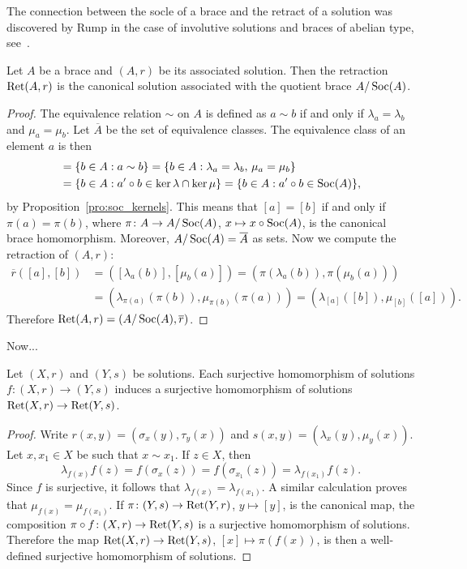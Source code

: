 The connection between the socle of a brace and the 
retract of a solution was discovered by Rump in the case of 
involutive solutions and braces of abelian type, see~\cite{MR2278047}. 

\begin{proposition}
\label{pro:add_cyclic}
Let $A$ be a brace and $(A,r)$ be its associated solution. 
Then the retraction $\operatorname{Ret}(A,r)$ is the canonical solution associated with the quotient brace $A/\operatorname{Soc}(A)$. 
\end{proposition}

\begin{proof}
    The equivalence relation $\sim$ on $A$ is defined as $a\sim b$ if and only if $\lambda_a=\lambda_b$ and 
    $\mu_a=\mu_b$. Let $\overline{A}$ be the set of equivalence classes. 
    The equivalence class of an element $a$ is then
    \begin{align*}
    [a]&=\{b\in A:a\sim b\}
    =\{b\in A:\lambda_a=\lambda_b,\,\mu_a=\mu_b\}\\
    &=\{b\in A:a'\circ b\in \ker\lambda\cap\ker\mu\}=\{b\in A:a'\circ b\in\Soc(A)\},
    \end{align*}
    by Proposition~\ref{pro:soc_kernels}. This means that 
    $[a]=[b]$ if and only if $\pi(a)=\pi(b)$, where $\pi\colon A\to A/\operatorname{Soc}(A)$, $x\mapsto x\circ\operatorname{Soc}(A)$,  
    is the canonical brace homomorphism. Moreover, $A/\operatorname{Soc}(A)=\overline{A}$ as sets. 
    Now we compute the retraction of $(A,r)$:
    \begin{align*}
        \overline{r}([a],[b]) &= ([\lambda_a(b)],[\mu_b(a)])
        =(\pi(\lambda_a(b)),\pi(\mu_b(a)))\\
        &=\left(\lambda_{\pi(a)}(\pi(b)),\mu_{\pi(b)}(\pi(a))\right)
        =\left(\lambda_{[a]}([b]),\mu_{[b]}([a])\right).
    \end{align*}
    Therefore $\operatorname{Ret}(A,r)=(A/\operatorname{Soc}(A),\overline{r})$. 
\end{proof}

Now...

\begin{proposition}
\label{pro:mpl}
Let $(X,r)$ and $(Y,s)$ be solutions. Each surjective homomorphism 
of solutions $f\colon (X,r)\to (Y,s)$ 
induces a surjective homomorphism 
of solutions $\operatorname{Ret}(X,r)\to\operatorname{Ret}(Y,s)$. 
\end{proposition}

\begin{proof}
Write $r(x,y)=(\sigma_x(y),\tau_y(x))$ and $s(x,y)=(\lambda_x(y),\mu_y(x))$. 
Let $x,x_1\in X$ be such that $x\sim x_1$. If $z\in X$, then 
\[
\lambda_{f(x)}f(z)=f(\sigma_x(z))=f(\sigma_{x_1}(z))=\lambda_{f(x_1)}f(z).
\]
Since $f$ is surjective, it follows that $\lambda_{f(x)}=\lambda_{f(x_1)}$. A similar calculation proves 
that $\mu_{f(x)}=\mu_{f(x_1)}$. If $\pi\colon (Y,s)\to\operatorname{Ret}(Y,r)$, $y\mapsto [y]$, is the canonical map, 
the composition $\pi\circ f\colon (X,r)\to\operatorname{Ret}(Y,s)$ is a surjective homomorphism of solutions. Therefore 
the map $\operatorname{Ret}(X,r)\to\operatorname{Ret}(Y,s)$, $[x]\mapsto\pi(f(x))$, is then a well-defined surjective
homomorphism of solutions. 
\end{proof}

